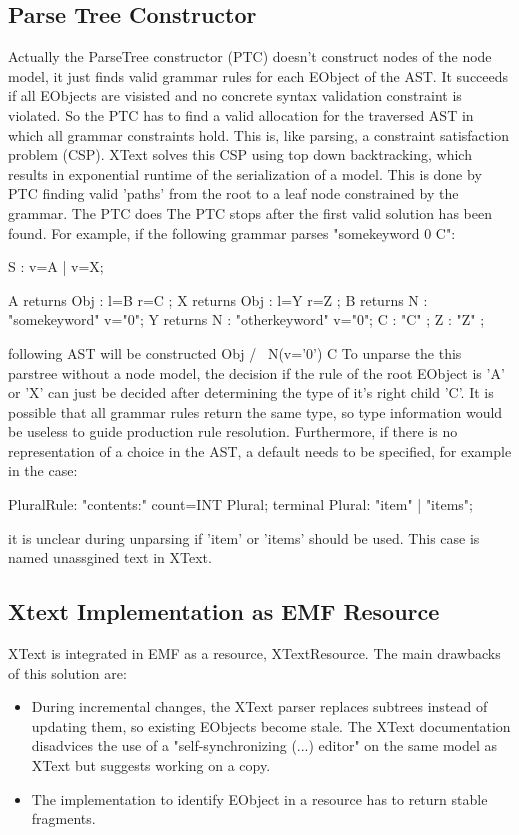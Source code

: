 \subsection{Parse Tree Constructor}
Actually the ParseTree constructor (PTC) doesn't construct nodes of the node model, it just finds valid grammar rules for each EObject of the AST. It succeeds if all EObjects are visisted and no concrete syntax validation constraint is violated. So the PTC has to find a valid allocation for the traversed AST in which all grammar constraints hold.  This is, like parsing, a constraint satisfaction problem (CSP). XText solves this CSP  using top down backtracking, which results in exponential runtime of the serialization of a model. This is done by PTC finding valid 'paths' from the root to a leaf node constrained by the grammar. The PTC does The PTC stops after the first valid solution has been found. 
For example, if the following grammar parses "somekeyword 0 C":
\begin{xtxt}
S  	:  	v=A 
	| 	v=X;

A returns Obj	: 	l=B r=C   ;
X returns Obj	: 	l=Y r=Z   ;
B returns N  	:  	"somekeyword" 	v="0";
Y returns N  	: 	"otherkeyword" 	v="0";
C 			:  	 "C" ;
Z 			: 	 "Z" ;
\end{xtxt}
following AST will be constructed
      Obj
     /   \
N(v='0')   C
To unparse the this parstree without a node model, the decision if the rule of the root EObject is 'A' or 'X' can just be decided after determining the type of it's right child 'C'. 
It is possible that all grammar rules return the same type, so type information would be useless to guide production rule resolution.
Furthermore, if there is no representation of a choice in the AST, a default needs to be specified, for example in the case: 
\begin{xtxt}
PluralRule: "contents:" count=INT Plural;
terminal Plural: "item" | "items";
\end{xtxt}
it is unclear during unparsing if 'item' or 'items' should be used. This case is named unassgined text in XText.

\subsection{Xtext Implementation as EMF  Resource}
XText is integrated in EMF as a resource, XTextResource.	 The main drawbacks of this solution are:
\begin{itemize}
	\item During incremental changes, the XText parser replaces subtrees instead of updating them, so existing EObjects become stale. The XText documentation disadvices the use of a "self-synchronizing (...) editor" on the same model as XText but suggests working on a copy.
	\item The implementation to identify EObject in a resource has to return stable fragments.
\end{itemize}

